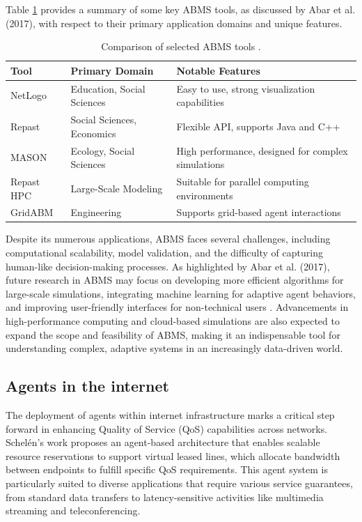 Table \ref{table:abms_comparison} provides a summary of some key ABMS tools, as discussed by Abar et al. (2017), with respect to their primary application domains and unique features.

\begin{table}[h!]
\centering
\begin{tabular}{|l|l|l|}
\hline
\textbf{Tool} & \textbf{Primary Domain} & \textbf{Notable Features} \\
\hline
NetLogo & Education, Social Sciences & Easy to use, strong visualization capabilities \\
Repast & Social Sciences, Economics & Flexible API, supports Java and C++ \\
MASON & Ecology, Social Sciences & High performance, designed for complex simulations \\
Repast HPC & Large-Scale Modeling & Suitable for parallel computing environments \\
GridABM & Engineering & Supports grid-based agent interactions \\
\hline
\end{tabular}
\caption{Comparison of selected ABMS tools \cite{abar2017}.}
\label{table:abms_comparison}
\end{table}

Despite its numerous applications, ABMS faces several challenges, including computational scalability, model validation, and the difficulty of capturing human-like decision-making processes. As highlighted by Abar et al. (2017), future research in ABMS may focus on developing more efficient algorithms for large-scale simulations, integrating machine learning for adaptive agent behaviors, and improving user-friendly interfaces for non-technical users \cite{abar2017}. Advancements in high-performance computing and cloud-based simulations are also expected to expand the scope and feasibility of ABMS, making it an indispensable tool for understanding complex, adaptive systems in an increasingly data-driven world.

\subsection{Agents in the internet}
The deployment of agents within internet infrastructure marks a critical step forward in enhancing Quality of Service (QoS) capabilities across networks. Schelén's work \cite{schelen1998qosagents} proposes an agent-based architecture that enables scalable resource reservations to support virtual leased lines, which allocate bandwidth between endpoints to fulfill specific QoS requirements. This agent system is particularly suited to diverse applications that require various service guarantees, from standard data transfers to latency-sensitive activities like multimedia streaming and teleconferencing.

